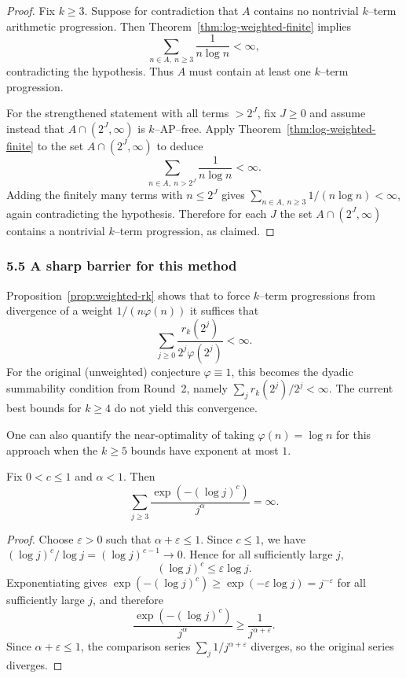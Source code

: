 \begin{proof}
Fix $k\ge 3$. Suppose for contradiction that $A$ contains no nontrivial $k$--term arithmetic progression. Then Theorem~\ref{thm:log-weighted-finite} implies
\[
\sum_{n\in A,\ n\ge 3}\frac{1}{n\log n}<\infty,
\]
contradicting the hypothesis. Thus $A$ must contain at least one $k$--term progression.

For the strengthened statement with all terms $>2^J$, fix $J\ge 0$ and assume instead that $A\cap(2^J,\infty)$ is $k$--AP--free. Apply Theorem~\ref{thm:log-weighted-finite} to the set $A\cap(2^J,\infty)$ to deduce
\[
\sum_{n\in A,\ n>2^J}\frac{1}{n\log n}<\infty.
\]
Adding the finitely many terms with $n\le 2^J$ gives $\sum_{n\in A,\ n\ge 3}1/(n\log n)<\infty$, again contradicting the hypothesis. Therefore for each $J$ the set $A\cap(2^J,\infty)$ contains a nontrivial $k$--term progression, as claimed.
\end{proof}

\subsubsection{5.5 A sharp barrier for this method}

Proposition~\ref{prop:weighted-rk} shows that to force $k$--term progressions from divergence of a weight $1/(n\varphi(n))$ it suffices that
\[
\sum_{j\ge 0}\frac{r_k(2^j)}{2^j\varphi(2^j)}<\infty.
\]
For the original (unweighted) conjecture $\varphi\equiv 1$, this becomes the dyadic summability condition from Round~2, namely $\sum_j r_k(2^j)/2^j<\infty$. The current best bounds for $k\ge 4$ do not yield this convergence.

One can also quantify the near-optimality of taking $\varphi(n)=\log n$ for this approach when the $k\ge 5$ bounds have exponent at most $1$.

\begin{lemma}
\label{lem:alpha-barrier}
Fix $0<c\le 1$ and $\alpha<1$. Then
\[
\sum_{j\ge 3}\frac{\exp(- (\log j)^c)}{j^{\alpha}}=\infty.
\]
\end{lemma}

\begin{proof}
Choose $\varepsilon>0$ such that $\alpha+\varepsilon\le 1$. Since $c\le 1$, we have $(\log j)^c/\log j=(\log j)^{c-1}\to 0$. Hence for all sufficiently large $j$,
\[
(\log j)^c\le \varepsilon\log j.
\]
Exponentiating gives $\exp(- (\log j)^c)\ge \exp(-\varepsilon\log j)=j^{-\varepsilon}$ for all sufficiently large $j$, and therefore
\[
\frac{\exp(- (\log j)^c)}{j^{\alpha}}\ge \frac{1}{j^{\alpha+\varepsilon}}.
\]
Since $\alpha+\varepsilon\le 1$, the comparison series $\sum_j 1/j^{\alpha+\varepsilon}$ diverges, so the original series diverges.
\end{proof}

